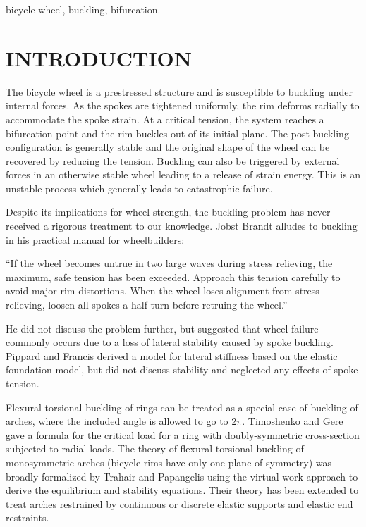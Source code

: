 \documentclass{bmd2016p}
\begin{document}
\begin{keywords}
bicycle wheel, 
buckling, 
bifurcation.
\end{keywords}

\section{INTRODUCTION}

The bicycle wheel is a prestressed structure and is susceptible to buckling under internal forces. As the spokes are tightened uniformly, the rim deforms radially to accommodate the spoke strain. At a critical tension, the system reaches a bifurcation point and the rim buckles out of its initial plane. The post-buckling configuration is generally stable and the original shape of the wheel can be recovered by reducing the tension. Buckling can also be triggered by external forces in an otherwise stable wheel leading to a release of strain energy. This is an unstable process which generally leads to catastrophic failure.

Despite its implications for wheel strength, the buckling problem has never received a rigorous treatment to our knowledge. Jobst Brandt alludes to buckling in his practical manual for wheelbuilders\cite{Brandt}:

``If the wheel becomes untrue in two large waves during stress relieving, the maximum, safe tension has been exceeded. Approach this tension carefully to avoid major rim distortions. When the wheel loses alignment from stress relieving, loosen all spokes a half turn before retruing the wheel.''

He did not discuss the problem further, but suggested that wheel failure commonly occurs due to a loss of lateral stability caused by spoke buckling. Pippard and Francis\cite{Pip2} derived a model for lateral stiffness based on the elastic foundation model, but did not discuss stability and neglected any effects of spoke tension.

Flexural-torsional buckling of rings can be treated as a special case of buckling of arches, where the included angle is allowed to go to $2\pi$. Timoshenko and Gere\cite{Tim} gave a formula for the critical load for a ring with doubly-symmetric cross-section subjected to radial loads. The theory of flexural-torsional buckling of monosymmetric arches (bicycle rims have only one plane of symmetry) was broadly formalized by Trahair and Papangelis\cite{Tra} using the virtual work approach to derive the equilibrium and stability equations. Their theory has been extended to treat arches restrained by continuous\cite{Brad1} or discrete\cite{Brad2} elastic supports and elastic end restraints\cite{Guo}.
\end{document}
